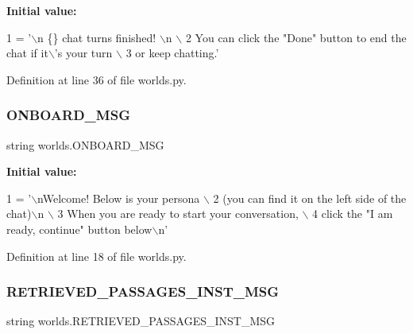 {\bfseries Initial value\+:}
\begin{DoxyCode}
1 =  \textcolor{stringliteral}{'\(\backslash\)n \{\} chat turns finished! \(\backslash\)n \(\backslash\)}
2 \textcolor{stringliteral}{        You can click the "Done" button to end the chat if it\(\backslash\)'s your turn \(\backslash\)}
3 \textcolor{stringliteral}{        or keep chatting.'}
\end{DoxyCode}


Definition at line 36 of file worlds.\+py.

\mbox{\label{namespaceworlds_a281f70599c0c90fe0f2774496a290a21}} 
\subsubsection{\texorpdfstring{O\+N\+B\+O\+A\+R\+D\+\_\+\+M\+SG}{ONBOARD\_MSG}}
{\footnotesize\ttfamily string worlds.\+O\+N\+B\+O\+A\+R\+D\+\_\+\+M\+SG}

{\bfseries Initial value\+:}
\begin{DoxyCode}
1 =  \textcolor{stringliteral}{'\(\backslash\)nWelcome! Below is your persona \(\backslash\)}
2 \textcolor{stringliteral}{        (you can find it on the left side of the chat)\(\backslash\)n \(\backslash\)}
3 \textcolor{stringliteral}{        When you are ready to start your conversation, \(\backslash\)}
4 \textcolor{stringliteral}{        click the "I am ready, continue" button below\(\backslash\)n'}
\end{DoxyCode}


Definition at line 18 of file worlds.\+py.

\mbox{\label{namespaceworlds_a4a2242a0fd46ff0169b6c4ff77ef348c}} 
\subsubsection{\texorpdfstring{R\+E\+T\+R\+I\+E\+V\+E\+D\+\_\+\+P\+A\+S\+S\+A\+G\+E\+S\+\_\+\+I\+N\+S\+T\+\_\+\+M\+SG}{RETRIEVED\_PASSAGES\_INST\_MSG}}
{\footnotesize\ttfamily string worlds.\+R\+E\+T\+R\+I\+E\+V\+E\+D\+\_\+\+P\+A\+S\+S\+A\+G\+E\+S\+\_\+\+I\+N\+S\+T\+\_\+\+M\+SG}

